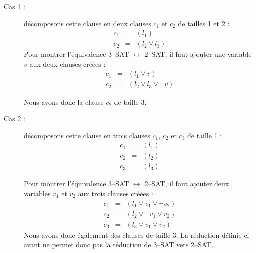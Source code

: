 \begin{description}
\item[Cas 1 :] décomposons cette clause en deux clauses $c_1$ et $c_2$ de tailles 1 et 2 :
\begin{eqnarray*}
c_1&=&(l_1) \\
c_2&=&(l_2 \vee l_3)
\end{eqnarray*}
Pour montrer l'équivalence 3--SAT $\leftrightarrow$ 2--SAT, il faut ajouter une variable $v$ aux deux clauses créées :
\begin{eqnarray*}
c_1&=&(l_1 \vee v) \\
c_2&=&(l_2 \vee l_3 \vee \neg v)
\end{eqnarray*}

Nous avons donc la clause $c_2$ de taille 3.

\item[Cas 2 :] décomposons cette clause en trois clauses $c_1$, $c_2$ et $c_3$ de taille 1 :
\begin{eqnarray*}
c_1 & = & (l_1) \\
c_2 & = & (l_2) \\
c_3 & = & (l_3)
\end{eqnarray*}

Pour montrer l'équivalence 3--SAT $\leftrightarrow$ 2--SAT, il faut ajouter deux variables $v_1$ et $v_2$ aux trois clauses créées :
\begin{eqnarray*}
c_1 & = & (l_1 \vee v_1 \vee \neg v_2) \\
c_2 & = & (l_2 \vee \neg v_1 \vee v_2)\\
c_3 & = & (l_3 \vee v_1 \vee v_2)
\end{eqnarray*}
Nous avons donc également des clauses de taille 3. La réduction définie ci-avant ne permet donc pas la réduction de 3--SAT vers 2--SAT.
\end{description}

